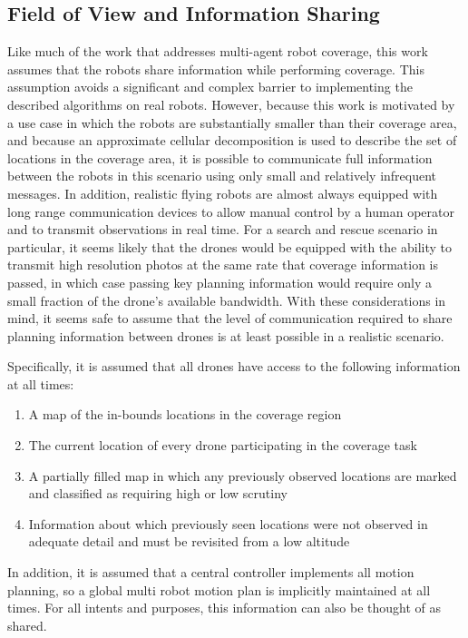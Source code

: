 \subsection{Field of View and Information Sharing}

Like much of the work that addresses multi-agent robot coverage, this work assumes that the robots share information while performing coverage. This assumption avoids a significant and complex barrier to implementing the described algorithms on real robots. However, because this work is motivated by a use case in which the robots are substantially smaller than their coverage area, and because an approximate cellular decomposition is used to describe the set of locations in the coverage area, it is possible to communicate full information between the robots in this scenario using only small and relatively infrequent messages. In addition, realistic flying robots are almost always equipped with long range communication devices to allow manual control by a human operator and to transmit observations in real time. For a search and rescue scenario in particular, it seems likely that the drones would be equipped with the ability to transmit high resolution photos at the same rate that coverage information is passed, in which case passing key planning information would require only a small fraction of the drone's available bandwidth. With these considerations in mind, it seems safe to assume that the level of communication required to share planning information between drones is at least possible in a realistic scenario.

Specifically, it is assumed that all drones have access to the following information at all times:

\begin{enumerate}
	\item A map of the in-bounds locations in the coverage region
	\item The current location of every drone participating in the coverage task
	\item A partially filled map in which any previously observed locations are marked and classified as requiring high or low scrutiny
	\item Information about which previously seen locations were not observed in adequate detail and must be revisited from a low altitude
\end{enumerate}

In addition, it is assumed that a central controller implements all motion planning, so a global multi robot motion plan is implicitly maintained at all times. For all intents and purposes, this information can also be thought of as shared.

